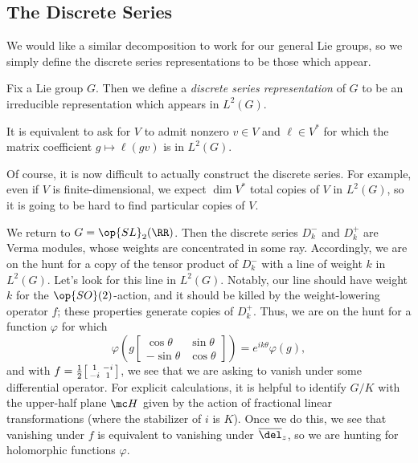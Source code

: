 \documentclass[../notes.tex]{subfiles}
\begin{document}
\subsection{The Discrete Series}
We would like a similar decomposition to work for our general Lie groups, so we simply define the discrete series representations to be those which appear.
\begin{definition}
	Fix a Lie group $G$. Then we define a \textit{discrete series representation} of $G$ to be an irreducible representation which appears in $L^2(G)$.
\end{definition}
\begin{remark}
	It is equivalent to ask for $V$ to admit nonzero $v\in V$ and $\ell\in V^*$ for which the matrix coefficient $g\mapsto\ell(gv)$ is in $L^2(G)$.
\end{remark}
Of course, it is now difficult to actually construct the discrete series. For example, even if $V$ is finite-dimen\-sional, we expect $\dim V^*$ total copies of $V$ in $L^2(G)$, so it is going to be hard to find particular copies of $V$.
\begin{example}
	We return to $G=\op{SL}_2(\RR)$. Then the discrete series $D_k^-$ and $D_k^+$ are Verma modules, whose weights are concentrated in some ray. Accordingly, we are on the hunt for a copy of the tensor product of $D_k^-$ with a line of weight $k$ in $L^2(G)$. Let's look for this line in $L^2(G)$. Notably, our line should have weight $k$ for the $\op{SO}(2)$-action, and it should be killed by the weight-lowering operator $f$; these properties generate copies of $D_k^+$. Thus, we are on the hunt for a function $\varphi$ for which
	\[\varphi\left(g\begin{bmatrix}
		\cos\theta & \sin\theta \\ -\sin\theta & \cos\theta
	\end{bmatrix}\right)=e^{ik\theta}\varphi(g),\]
	and with $f=\frac12\begin{bsmallmatrix}
		1 & -i \\ -i & 1
	\end{bsmallmatrix}$, we see that we are asking to vanish under some differential operator. For explicit calculations, it is helpful to identify $G/K$ with the upper-half plane $\mc H$ given by the action of fractional linear transformations (where the stabilizer of $i$ is $K$). Once we do this, we see that vanishing under $f$ is equivalent to vanishing under $\overline\del_z$, so we are hunting for holomorphic functions $\varphi$.
\end{example}
\end{document}
